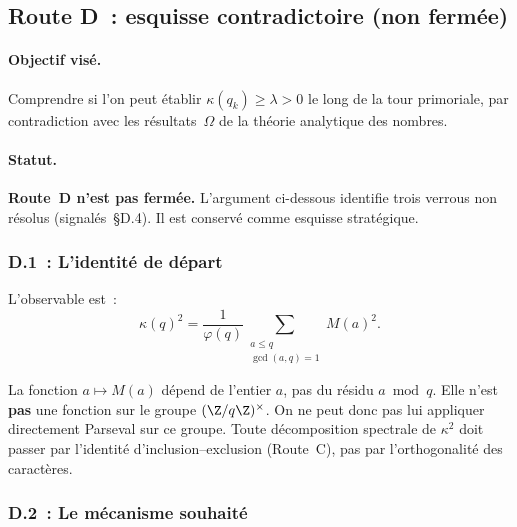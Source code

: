 
\subsection{Route D~: esquisse contradictoire (non ferm\'ee)}

\paragraph{Objectif vis\'e.}
Comprendre si l'on peut \'etablir $\kappa(q_k)\ge\lambda>0$ le long
de la tour primoriale, par contradiction avec les r\'esultats~$\Omega$
de la th\'eorie analytique des nombres.

\paragraph{Statut.} \textbf{Route~D n'est pas ferm\'ee.}
L'argument ci-dessous identifie trois verrous non r\'esolus
(signal\'es~\S D.4). Il est conserv\'e comme esquisse strat\'egique.

\subsubsection{D.1~: L'identit\'e de d\'epart}

L'observable est~:
\[
\kappa(q)^2 = \frac{1}{\varphi(q)}\sum_{\substack{a\le q\\\gcd(a,q)=1}}M(a)^2.
\]

\begin{remark}\label{rem:not_periodic}
La fonction $a\mapsto M(a)$ d\'epend de l'entier $a$, pas du r\'esidu
$a\bmod q$. Elle n'est \textbf{pas} une fonction sur le groupe
$(\Z/q\Z)^\times$. On ne peut donc pas lui appliquer directement
Parseval sur ce groupe. Toute d\'ecomposition spectrale de $\kappa^2$
doit passer par l'identit\'e d'inclusion--exclusion (Route~C),
pas par l'orthogonalit\'e des caract\`eres.
\end{remark}

\subsubsection{D.2~: Le m\'ecanisme souhait\'e}

